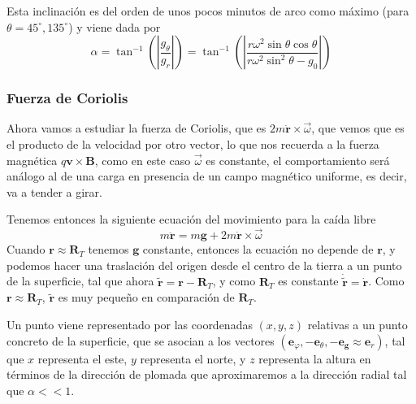 Esta inclinación es del orden de unos pocos minutos de arco como máximo (para $\theta= 45^\circ ,135^\circ $) y viene dada por
\begin{equation} \label{6.1.1}
    \alpha = \tan^{-1}\left(\left|\frac{g_\theta}{g_r}\right|\right) = \tan^{-1}\left(\left|\frac{r\omega^2 \sin \theta \cos \theta}{r\omega^2\sin^2\theta-g_0}\right|\right)
\end{equation} 
\vspace{-20pt}
\subsubsection{Fuerza de Coriolis}
Ahora vamos a estudiar la fuerza de Coriolis, que es $2 m \dot{\mathbf{r}} \times  \vec{\omega}$, que vemos que es el producto de la velocidad por otro vector, lo que nos recuerda a la fuerza magnética $q \mathbf{v} \times \mathbf{B}$, como en este caso $\vec\omega$ es constante, el comportamiento será análogo al de una carga en presencia de un campo magnético uniforme, es decir, va a tender a girar.

Tenemos entonces la siguiente ecuación del movimiento para la caída libre
\begin{equation} \label{6.1.1}
    m\ddot{\mathbf{r}}=  m\mathbf{g} + 2 m \dot{\mathbf{r}} \times  \vec{\omega}
\end{equation} 
Cuando $\mathbf{r} \approx \mathbf{R}_T$ tenemos $\mathbf{g}$ constante, entonces la ecuación no depende de $\mathbf{r}$, y podemos hacer una traslación del origen desde el centro de la tierra a un punto de la superficie, tal que ahora $\tilde{\mathbf{r}} = \mathbf{r} - \mathbf{R}_T$, y como $\mathbf{R}_T$ es constante $\dot{\tilde{\mathbf{r}}} = \dot{\mathbf{r}}$. Como $\mathbf{r} \approx \mathbf{R}_T$, $\tilde{\mathbf{r}}$ es muy pequeño en comparación de $\mathbf{R}_T$.

Un punto viene representado por las coordenadas $(x,y,z)$ relativas a un punto concreto de la superficie, que se asocian a los vectores $(\mathbf{e}_\varphi,-\mathbf{e}_\theta,-\mathbf{e}_\mathbf{g} \approx \mathbf{e}_r)$, tal que $x$ representa el este, $y$ representa el norte, y $z$ representa la altura en términos de la dirección de plomada que aproximaremos a la dirección radial tal que $\alpha << 1$.

